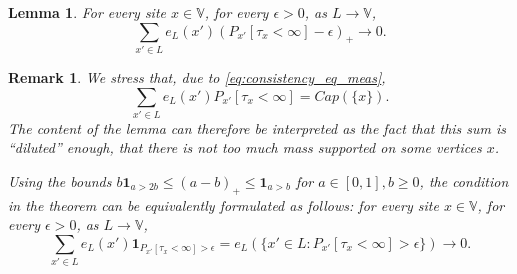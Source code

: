 \documentclass[12pt,a4paper]{article}
\newtheorem{lemma}[theo]{Lemma}
\newtheorem{remark}[theo]{Remark}
\newcommand{\1}[1]{{\mathbf 1}{\{#1\}}}
\newcommand{\8}{{\infty}}
\newcommand{\ind}{{\mathbf{1}}} %
\begin{document}
\begin{lemma}\label{lem:quantitative_weak}
  For every site $x\in \mathbb{V}$, for every $\epsilon>0$, as $L \to \mathbb{V}$,
  \begin{equation}
    \sum_{x'\in L} e_L(x') \left(P_{x'}[\tau_x < \infty]-\epsilon \right)_+ \to 0.
  \end{equation}
\end{lemma}

\begin{remark} \label{rem:rewrite_quantitative_weak}
  We stress that, due to \eqref{eq:consistency_eq_meas},
\begin{equation}
    \sum_{x'\in L} e_L(x') P_{x'}[\tau_x < \infty]= Cap(\{x\}).
  \end{equation}
The content of the lemma can therefore be interpreted as the fact that this sum is ``diluted'' enough, that there is not too much mass supported on some vertices $x$.  

Using the bounds $b \ind_{a > 2b} \le (a-b)_+ \le \ind_{a > b}$ for $a \in [0, 1], b \ge 0$, the condition in the theorem can be equivalently formulated as follows: for every site $x\in \mathbb{V}$, for every $\epsilon>0$, as $L\to \mathbb{V}$,
  \begin{equation}
    \sum_{x'\in  L} e_L(x') \ind_{P_{x'}[\tau_x < \infty ] >\epsilon} = e_L(\{x'\in L : P_{x'}[\tau_x < \infty ] >\epsilon \} )\to 0.
  \end{equation}
\end{remark}
\end{document}
